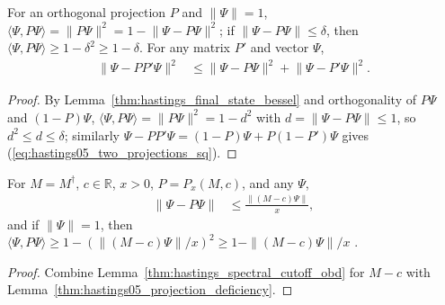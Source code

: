 \begin{lemma}
    \label{thm:hastings05_projection_deficiency}
    \leanok
    For an orthogonal projection $P$ and $\|\Psi\|=1$,
    $\langle\Psi,P\Psi\rangle=\lVert P\Psi\rVert^2=1-\lVert\Psi-P\Psi\rVert^2$;
    if $\lVert\Psi-P\Psi\rVert\le\delta$, then
    $\langle\Psi,P\Psi\rangle\ge1-\delta^2\ge1-\delta$. For any matrix $P'$ and
    vector $\Psi$,
    \begin{align}
        \lVert\Psi-PP'\Psi\rVert^2
         & \le\lVert\Psi-P\Psi\rVert^2+\lVert\Psi-P'\Psi\rVert^2.
        \label{eq:hastings05_two_projections_sq}
    \end{align}
\end{lemma}
\begin{proof}\leanok
    By Lemma~\ref{thm:hastings_final_state_bessel} and orthogonality of
    $P\Psi$ and $(1-P)\Psi$, $\langle\Psi,P\Psi\rangle=\|P\Psi\|^2=1-d^2$ with
    $d=\|\Psi-P\Psi\|\le1$, so $d^2\le d\le\delta$; similarly
    $\Psi-PP'\Psi=(1-P)\Psi+P(1-P')\Psi$ gives
    (\ref{eq:hastings05_two_projections_sq}).
\end{proof}

\begin{lemma}
    \label{thm:hastings05_one_level}
    \leanok
    For $M=M^\dagger$, $c\in\mathbb R$, $x>0$, $P=P_x(M,c)$, and any $\Psi$,
    \begin{align}
        \lVert\Psi-P\Psi\rVert
         & \le\frac{\lVert(M-c)\Psi\rVert}{x},
        \label{eq:hastings05_one_level}
    \end{align}
    and if $\|\Psi\|=1$, then
    $\langle\Psi,P\Psi\rangle\ge1-(\|(M-c)\Psi\|/x)^2\ge1-\|(M-c)\Psi\|/x$
    \cite[lines 645--657]{Hastings2006Solving}.
\end{lemma}
\begin{proof}\leanok
    Combine Lemma~\ref{thm:hastings_spectral_cutoff_obd} for $M-c$ with
    Lemma~\ref{thm:hastings05_projection_deficiency}.
\end{proof}

